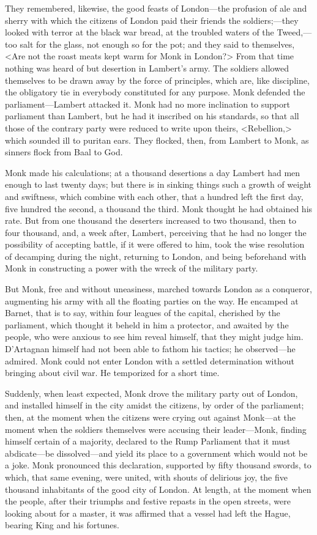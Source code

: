 They remembered, likewise, the good feasts of London—the profusion of ale and sherry with which the citizens of London paid their friends the soldiers;—they looked with terror at the black war bread, at the troubled waters of the Tweed,—too salt for the glass, not enough so for the pot; and they said to themselves, <Are not the roast meats kept warm for Monk in London?> From that time nothing was heard of but desertion in Lambert's army. The soldiers allowed themselves to be drawn away by the force of principles, which are, like discipline, the obligatory tie in everybody constituted for any purpose. Monk defended the parliament—Lambert attacked it. Monk had no more inclination to support parliament than Lambert, but he had it inscribed on his standards, so that all those of the contrary party were reduced to write upon theirs, <Rebellion,> which sounded ill to puritan ears. They flocked, then, from Lambert to Monk, as sinners flock from Baal to God.

Monk made his calculations; at a thousand desertions a day Lambert had men enough to last twenty days; but there is in sinking things such a growth of weight and swiftness, which combine with each other, that a hundred left the first day, five hundred the second, a thousand the third. Monk thought he had obtained his rate. But from one thousand the deserters increased to two thousand, then to four thousand, and, a week after, Lambert, perceiving that he had no longer the possibility of accepting battle, if it were offered to him, took the wise resolution of decamping during the night, returning to London, and being beforehand with Monk in constructing a power with the wreck of the military party.

But Monk, free and without uneasiness, marched towards London as a conqueror, augmenting his army with all the floating parties on the way. He encamped at Barnet, that is to say, within four leagues of the capital, cherished by the parliament, which thought it beheld in him a protector, and awaited by the people, who were anxious to see him reveal himself, that they might judge him. D'Artagnan himself had not been able to fathom his tactics; he observed—he admired. Monk could not enter London with a settled determination without bringing about civil war. He temporized for a short time.

Suddenly, when least expected, Monk drove the military party out of London, and installed himself in the city amidst the citizens, by order of the parliament; then, at the moment when the citizens were crying out against Monk—at the moment when the soldiers themselves were accusing their leader—Monk, finding himself certain of a majority, declared to the Rump Parliament that it must abdicate—be dissolved—and yield its place to a government which would not be a joke. Monk pronounced this declaration, supported by fifty thousand swords, to which, that same evening, were united, with shouts of delirious joy, the five thousand inhabitants of the good city of London. At length, at the moment when the people, after their triumphs and festive repasts in the open streets, were looking about for a master, it was affirmed that a vessel had left the Hague, bearing King  and his fortunes.

